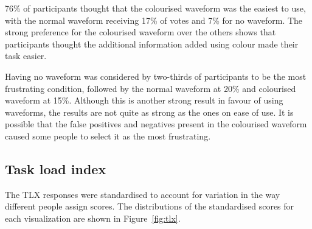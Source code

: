 76\% of participants thought that the colourised waveform was the easiest to use, with the normal waveform receiving
17\% of votes and 7\% for no waveform.  The strong preference for the colourised waveform over the others shows that
participants thought the additional information added using colour made their task easier.

Having no waveform was considered by two-thirds of participants to be the most frustrating condition, followed by the
normal waveform at 20\% and colourised waveform at 15\%. Although this is another strong result in favour of using
waveforms, the results are not quite as strong as the ones on ease of use. It is possible that the false positives and
negatives present in the colourised waveform caused some people to select it as the most frustrating.

\subsection{Task load index}
The TLX responses were standardised to account for variation in the way different people assign scores. The
distributions of the standardised scores for each visualization are shown in Figure~\ref{fig:tlx}.

